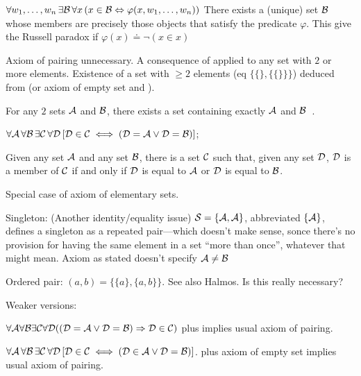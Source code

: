 $\forall w_1,\ldots,w_n \, \exists \mathcal{B} \, 
\forall x \, ( x \in \mathcal{B} 
\Leftrightarrow \varphi(x, w_1, \ldots, w_n) )$
There exists a (unique) set $\mathcal{B}$ 
whose members are precisely those objects 
that satisfy the predicate $\varphi$.
This give the Russell paradox if 
$\varphi(x) \doteq \neg(x \in x)$

\label{sec:Axiom-of-pairing}

Axiom of pairing unnecessary.
A consequence of 
applied to any set with $2$ or more elements.
Existence of a set with $\geq 2$ elements
(eq $\{ \{\}, \{ \{\} \} \}$)
deduced from 
(or axiom of empty set\cite{wiki:AxiomOfEmptySet}
and ).

For any $2$ sets $\mathcal{A}$ and $\mathcal{B}$,
there exists a set containing exactly $\mathcal{A}$ and 
$\mathcal{B}$~\cite{wiki:AxiomOfPairing}.

$\forall \mathcal{A}\,\forall \mathcal{B}\,\exists \mathcal{C}\,\forall \mathcal{D}\,
[\mathcal{D}\in \mathcal{C}\iff (\mathcal{D}=\mathcal{A}\lor \mathcal{D}=\mathcal{B})]$;

Given any set $\mathcal{A}$ and any set $\mathcal{B}$, 
there is a set $\mathcal{C}$ such that, 
given any set $\mathcal{D}$, 
$\mathcal{D}$ is a member of $\mathcal{C}$ 
if and only if 
$\mathcal{D}$ is equal to $\mathcal{A}$ 
or 
$\mathcal{D}$ is equal to $\mathcal{B}$.

Special case of axiom of elementary 
sets\cite{wiki:ZermeloSetTheory}.

Singleton:
(Another identity/equality issue)
$\mathcal{S}=\{\mathcal{A},\mathcal{A}\}$, abbreviated $\{\mathcal{A}\}$,
defines a singleton as a repeated pair---which doesn't make sense,
sonce there's no provision for having the same element
in a set ``more than once'', whatever that might mean.
Axiom as stated doesn't specify $\mathcal{A} \neq \mathcal{B}$

Ordered pair:
$(a,b)=\{\{a\},\{a,b\}\}$.
See also Halmos\cite{Halmos1960Naive}.
Is this really necessary? 

Weaker versions:
 
${\displaystyle 
\forall \mathcal{A} \forall \mathcal{B} 
\exists \mathcal{C}
\forall \mathcal{D}((\mathcal{D}=\mathcal{A}\lor \mathcal{D}=\mathcal{B}) \Rightarrow \mathcal{D}\in \mathcal{C})}$
plus 
implies usual axiom of pairing.

${\displaystyle 
\forall \mathcal{A}\,\forall \mathcal{B}\,
\exists \mathcal{C}\,
\forall \mathcal{D}\,[\mathcal{D}\in \mathcal{C}
\iff (\mathcal{D}\in \mathcal{A}\lor \mathcal{D}=\mathcal{B})]}$.
plus 
axiom of empty set
implies usual axiom of pairing.

